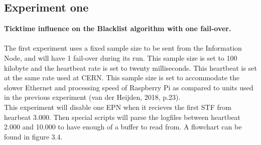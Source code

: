 \subsection{Experiment one}
\textbf{Ticktime influence on the Blacklist algorithm with one fail-over.}
\\\\
The first experiment uses a fixed sample size to be sent from the Information Node, and will have 1 fail-over during its run. This sample size is set to 100 kilobyte and the heartbeat rate is set to twenty milliseconds. This heartbeat is set at the same rate used at CERN. This sample size is set to accommodate the slower Ethernet and processing speed of Raspberry Pi as compared to units used in the previous experiment (van der Heijden, 2018, p.23). \\
This experiment will disable one EPN when it recieves the first STF from hearbeat 3.000. Then special scripts will parse the logfiles between heartbeat 2.000 and 10.000 to have enough of a buffer to read from. A flowchart can be found in figure 3.4.

